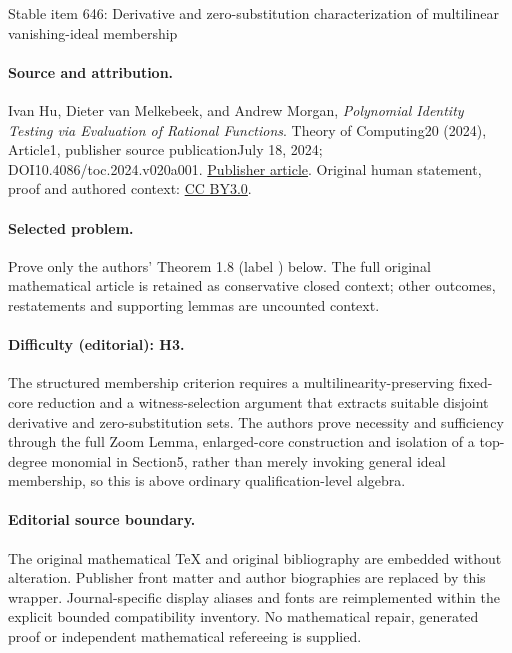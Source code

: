 \documentclass[11pt]{article}
\numberwithin{equation}{section}
\theoremstyle{definition}
\theoremstyle{plain}
\begin{document}
\begin{center}{\Large Stable item 646: Derivative and zero-substitution characterization of multilinear vanishing-ideal membership}\end{center}
\paragraph{Source and attribution.}
Ivan Hu, Dieter van Melkebeek, and Andrew Morgan, \emph{Polynomial Identity Testing via Evaluation of Rational Functions}. Theory of Computing20 (2024), Article1, publisher source publicationJuly 18, 2024; DOI10.4086/toc.2024.v020a001. \href{https://theoryofcomputing.org/articles/v020a001/}{Publisher article}. Original human statement, proof and authored context: \href{https://creativecommons.org/licenses/by/3.0/}{CC BY3.0}.
\paragraph{Selected problem.}
Prove only the authors' Theorem 1.8 (label ) below. The full original mathematical article is retained as conservative closed context; other outcomes, restatements and supporting lemmas are uncounted context.
\paragraph{Difficulty (editorial): H3.}
The structured membership criterion requires a multilinearity-preserving fixed-core reduction and a witness-selection argument that extracts suitable disjoint derivative and zero-substitution sets. The authors prove necessity and sufficiency through the full Zoom Lemma, enlarged-core construction and isolation of a top-degree monomial in Section5, rather than merely invoking general ideal membership, so this is above ordinary qualification-level algebra.
\paragraph{Editorial source boundary.}
The original mathematical TeX and original bibliography are embedded without alteration. Publisher front matter and author biographies are replaced by this wrapper. Journal-specific display aliases and fonts are reimplemented within the explicit bounded compatibility inventory. No mathematical repair, generated proof or independent mathematical refereeing is supplied.
\clearpage

%
%
%
\end{document}
